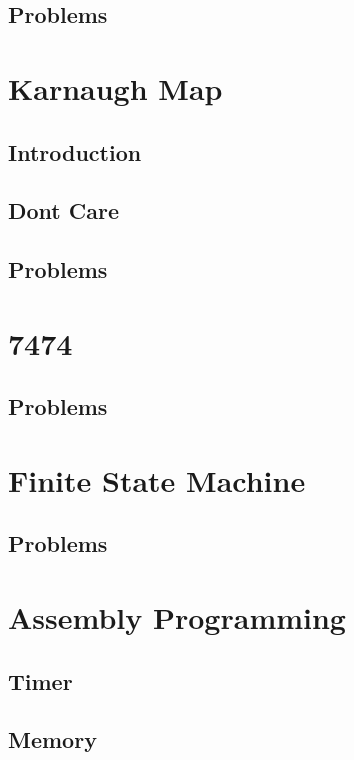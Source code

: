 \documentclass[11pt]{book}
\begin{document}
\section{Problems}

\chapter{Karnaugh Map}
\section{Introduction}

\section{Dont Care}

\section{Problems}

\chapter{7474}

\section{Problems}

\chapter{Finite State Machine}

\section{Problems}


\chapter{Assembly Programming}




\section{Timer}

\section{Memory}

\end{document}

